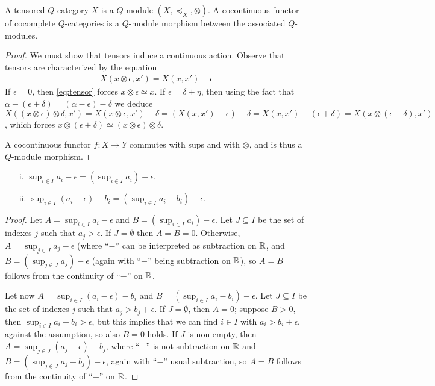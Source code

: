 \begin{proposition}
A tensored $Q$-category $X$ is a $Q$-module $(X, \preceq_{X}, \otimes)$.
A cocontinuous functor of cocomplete $Q$-categories is a $Q$-module morphism between the associated $Q$-modules.
\end{proposition}
\begin{proof}
We must show that tensors induce a continuous action. Observe that tensors are characterized by the equation 
\begin{align}\label{eq:tensor}
X(x\otimes \epsilon, x') = X(x,x') -\epsilon
\end{align}
If $\epsilon=0$, then \eqref{eq:tensor} forces $x\otimes \epsilon\simeq x$. 
If $\epsilon=\delta+\eta$, then using the fact that $\alpha-(\epsilon+\delta)=(\alpha-\epsilon)-\delta$ 
we deduce $X((x\otimes \epsilon)\otimes \delta, x')=X(x\otimes \epsilon, x')-\delta=(X(x,x')-\epsilon)-\delta=X(x,x')-(\epsilon+\delta)=X(x\otimes (\epsilon+\delta),x')$, which forces $x\otimes(\epsilon+\delta)\simeq (x\otimes \epsilon)\otimes \delta$.

A cocontinuous functor $f:X\to Y$ commutes with sups and with $\otimes$, and is thus a $Q$-module morphism.
\end{proof}


\begin{lemma}
\begin{itemize}
\item[i.] $\sup_{i\in I}a_{i}-\epsilon= (\sup_{i\in I}a_{i})-\epsilon$.
\item[ii.] $\sup_{i\in I}(a_{i}-\epsilon)-b_{i}= (\sup_{i\in I}a_{i}-b_{i})-\epsilon$.


\end{itemize}
\end{lemma}
\begin{proof}
Let $A= \sup_{i\in I}a_{i}-\epsilon$ and $B= (\sup_{i\in I}a_{i})-\epsilon$.
Let $J\subseteq I$ be the set of indexes $j$ such that $a_{j}>\epsilon$. 
If $J=\emptyset$ then $A=B=0$. Otherwise, 
$A= \sup_{j\in J}a_{j}-\epsilon$ (where ``$-$'' can be interpreted as subtraction on $\mathbb{R}$, and 
$B= (\sup_{j\in J}a_{j})-\epsilon$ (again with ``$-$'' being subtraction on $\mathbb{R}$), so $A=B$ follows from the continuity of ``$-$'' on $\mathbb{R}$.

Let now $A= \sup_{i\in I}(a_{i}-\epsilon)-b_{i}$ and $B= (\sup_{i\in I}a_{i}-b_{i})-\epsilon$.
Let $J\subseteq I$ be the set of indexes $j$ such that $a_{j}> b_{j}+\epsilon$.
If $J=\emptyset$, then $A=0$; suppose $B>0$, then $\sup_{i\in I}a_{i}-b_{i}>\epsilon$, but this implies that we can find $i\in I$ with $a_{i}>b_{i}+\epsilon$, against the assumption, so also $B=0$ holds. If $J$ is non-empty, then 
$A= \sup_{j\in J}(a_{j}-\epsilon)-b_{j}$, where ``$-$'' is not subtraction on $\mathbb{R}$ and 
$B= (\sup_{j\in J}a_{j}-b_{j})-\epsilon$, again with ``$-$'' usual subtraction, so $A=B$ follows from the continuity of ``$-$'' on $\mathbb{R}$.
 \end{proof}


